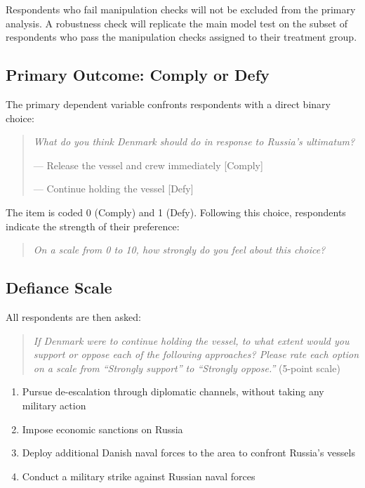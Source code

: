 Respondents who fail manipulation checks will not be excluded from the primary analysis. A robustness check will replicate the main model test on the subset of respondents who pass the manipulation checks assigned to their treatment group.

\subsection{Primary Outcome: Comply or Defy}

The primary dependent variable confronts respondents with a direct binary choice:

\begin{quote}
\textit{What do you think Denmark should do in response to Russia's ultimatum?}

 --- Release the vessel and crew immediately \hfill [Comply]

 --- Continue holding the vessel \hfill [Defy]
\end{quote}

\noindent The item is coded 0 (Comply) and 1 (Defy). Following this choice, respondents indicate the strength of their preference:

\begin{quote}
\textit{On a scale from 0 to 10, how strongly do you feel about this choice?}
\end{quote}

\subsection{Defiance Scale}

All respondents are then asked:

\begin{quote}
\textit{If Denmark were to continue holding the vessel, to what extent would you support or oppose each of the following approaches? Please rate each option on a scale from ``Strongly support'' to ``Strongly oppose.''} (5-point scale)
\end{quote}

\begin{enumerate}
    \item Pursue de-escalation through diplomatic channels, without taking any military action
    \item Impose economic sanctions on Russia
    \item Deploy additional Danish naval forces to the area to confront Russia's vessels
    \item Conduct a military strike against Russian naval forces
\end{enumerate}

